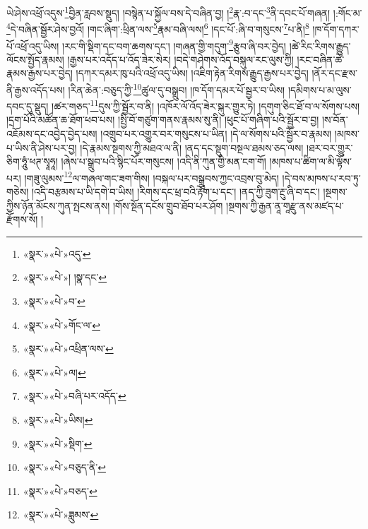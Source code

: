 ཡེ་ཤེས་འཕྲོ་འདུས་\footnote{«སྣར་»«པེ་»འདུ་}བྱིན་རླབས་སྡུད། །བསྙེན་པ་སྐྱོལ་བས་དེ་བཞིན་བྱ། །\footnote{«སྣར་»«པེ་»། །སྣ་དང་}རྣ་:བ་དང་\footnote{«སྣར་»«པེ་»བ་}ནི་དབང་པོ་གཞན། །:གོང་མ་\footnote{«སྣར་»«པེ་»གོང་ལ་}དེ་བཞིན་སྦྱོར་ཤེས་བྱའོ། །གང་ཞིག་:ཕྲིན་ལས་\footnote{«སྣར་»«པེ་»འཕྲིན་ལས་}རྣམ་བཞི་ལས།\footnote{«སྣར་»«པེ་»ལ།} །དང་པོ་:ཞི་བ་གསུངས་\footnote{«སྣར་»«པེ་»བཞི་པར་འདོད་}པ་ནི།\footnote{«སྣར་»«པེ་»ཡིས།} །ཁ་དོག་དཀར་པོ་འཕྲོ་འདུ་ཡིས། །རང་གི་སྡིག་དང་བག་ཆགས་དང་། །གཞན་གྱི་གདུག་\footnote{«སྣར་»«པེ་»སྡིག་}རྩུབ་ཞི་བར་བྱེད། །ཚེ་རིང་རིགས་རྒྱུད་ལོངས་སྤྱོད་རྣམས། །རྒྱས་པར་འདོད་པ་འོད་ཟེར་སེར། །བདེ་གཤེགས་འོད་བསྐུལ་རང་ལུས་ཀྱི། །རང་བཞིན་ཚེ་རྣམས་རྒྱས་པར་བྱེད། །དཀར་དམར་ཁུ་པའི་འཕྲོ་འདུ་ཡིས། །འཇིག་རྟེན་རིགས་རྒྱུད་རྒྱས་པར་བྱེད། །ནོར་དང་རྫས་ནི་རྒྱས་འདོད་པས། །རིན་ཆེན་:བཅུད་ཀྱི་\footnote{«སྣར་»«པེ་»བཅུད་ནི་}ཚུལ་དུ་བསྒྲུབ། །ཁ་དོག་དམར་པོ་སྦྱར་བ་ཡིས། །དམིགས་པ་མ་ལུས་དབང་དུ་སྡུད། །ཚར་གཅད་\footnote{«སྣར་»«པེ་»བཅད་}དུས་ཀྱི་སྦྱོར་བ་ནི། །འཁོར་ལོ་འོད་ཟེར་སྐུར་གྱུར་ཏེ། །དགུག་ཅིང་ཐོ་བ་ལ་སོགས་པས། །དྲག་པོའི་མཚོན་ཆ་ཐོག་ཕབ་པས། །སྤྱི་བོ་གཙུག་གནས་རྣམས་སུ་ནི། །ཕུང་པོ་གཞིག་པའི་སྦྱོར་བ་བྱ། །ས་བོན་འཇོམས་དང་འབྱེད་བྱེད་པས། །འགྲུབ་པར་འགྱུར་བར་གསུངས་པ་ཡིན། །དེ་ལ་སོགས་པའི་སྦྱོར་བ་རྣམས། །མཁས་པ་ཡིས་ནི་ཤེས་པར་བྱ། །དེ་རྣམས་སྔགས་ཀྱི་མཐའ་ལ་ནི། །ནད་དང་སྡུག་བསྔལ་ཐམས་ཅད་ལས། །ཐར་བར་གྱུར་ཅིག་ཧཱུཾ་ཕཊ་སྭཱཧཱ། །ཞེས་པ་སྒྲུབ་པའི་སྙིང་པོར་གསུངས། །འདི་ནི་ཀུན་གྱི་མན་ངག་གོ། །མཁས་པ་ཚིག་ལ་མི་ལྟོས་པར། །གཟུ་ལུམས་\footnote{«སྣར་»«པེ་»ཟླུམས་}ལ་གཞལ་གང་ཟག་གིས། །བསྐལ་པར་བསྒྲུབས་ཀྱང་འབྲས་བུ་མེད། །དེ་བས་མཁས་པ་རབ་ཏུ་གཅེས། །འདི་བརྩམས་པ་ཡི་དགེ་བ་ཡིས། །རིགས་དང་ཕྲ་བའི་རྟོག་པ་དང་། །ནད་ཀྱི་ཟུག་རྔུ་ཞི་བ་དང་། །སྔགས་ཀྱིས་ཉོན་མོངས་ཀུན་སྤངས་ནས། །གོས་སྔོན་དངོས་གྲུབ་ཐོབ་པར་ཤོག །སྔགས་ཀྱི་རྒྱན་ནཱ་གཱརྫུ་ནས་མཛད་པ་རྫོགས་སོ། ། 